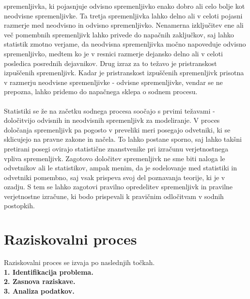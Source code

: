 \documentclass[12pt,a4paper]{amsart}
\theoremstyle{definition} %
\theoremstyle{plain} %
\begin{document}
spremenljivka, ki pojasnjuje odvisno spremenljivko enako dobro ali celo bolje kot neodvisne spremenljivke. Ta tretja spremenljivka lahko delno
ali v celoti pojasni razmerje med neodvisno in odvisno spremenljivko. Nenamerna izključitev ene ali več pomembnih spremenljivk lahko privede do
napačnih zaključkov, saj lahko statistik zmotno verjame, da neodvisna spremenljivka močno napoveduje odvisno spremenljivko, medtem ko je v
resnici razmerje dejansko delno ali v celoti posledica posrednih dejavnikov. Drug izraz za to težavo je pristranskost izpuščenih spremenljivk.
Kadar je pristranskost izpuščenih spremenljivk prisotna v razmerju neodvisne spremenljivke - odvisne spremenljivke, vendar se ne prepozna, lahko
pridemo do napačnega sklepa o sodnem procesu.\\\\
Statistiki se že na začetku sodnega procesa soočajo s prvimi težavami - določitvijo odvisnih in neodvisnih spremenljivk za
modeliranje. V proces določanja spremenljivk pa pogosto v preveliki meri posegajo odvetniki, ki se sklicujejo na pravne zakone in načela. To lahko
postane sporno, saj lahko takšni pretirani posegi ovirajo statistične znanstvenike pri izračunu verjetnostnega vpliva spremenljivk. Zagotovo 
določitev spremenljivk ne sme biti naloga le odvetnikov ali le statistikov, ampak menim, da je sodelovanje med statistiki in odvetniki pomembno, 
saj vsak prispeva svoj del poznavanja teorije, ki je v ozadju.  S tem se lahko zagotovi pravilno opredelitev spremenljivk in pravilne verjetnostne 
izračune, ki bodo prispevali k pravičnim odločitvam v sodnih postopkih.

\section{Raziskovalni proces}
Raziskovalni proces se izvaja po naslednjih točkah.\\
\textbf{1. Identifikacija problema.\\} 
\textbf{2. Zasnova raziskave.\\} 
\textbf{3. Analiza podatkov.\\}

\end{document}
